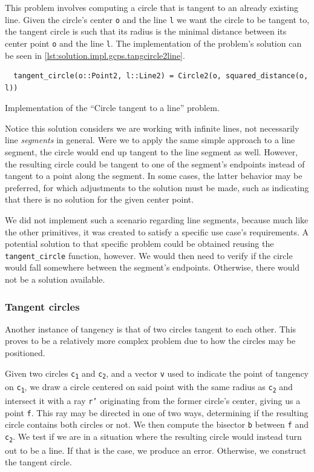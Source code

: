 This problem involves computing a circle that is tangent to an already existing
line.  Given the circle's center \texttt{o} and the line \texttt{l} we want the
circle to be tangent to, the tangent circle is such that its radius is the
minimal distance between its center point \texttt{o} and the line \texttt{l}.
The implementation of the problem's solution can be seen in
\cref{lst:solution.impl.gcps.tangcircle2line}.

\begin{listing}[htb]
  \begin{verbatim}
  tangent_circle(o::Point2, l::Line2) = Circle2(o, squared_distance(o, l))
  \end{verbatim}
  \caption[Circle tangent to a line]{
    Implementation of the ``Circle tangent to a line'' problem.}%
  \label{lst:solution.impl.gcps.tangcircle2line}
\end{listing}

Notice this solution considers we are working with infinite lines, not
necessarily line \textit{segments} in general.  Were we to apply the same simple
approach to a line segment, the circle would end up tangent to the line segment
as well.  However, the resulting circle could be tangent to one of the segment's
endpoints instead of tangent to a point along the segment.  In some cases, the
latter behavior may be preferred, for which adjustments to the solution must be
made, such as indicating that there is no solution for the given center point.

We did not implement such a scenario regarding line segments, because much like
the other primitives, it was created to satisfy a specific use case's
requirements.  A potential solution to that specific problem could be obtained
reusing the \texttt{tangent\_circle} function, however.  We would then need to
verify if the circle would fall somewhere between the segment's endpoints.
Otherwise, there would not be a solution available.

\subsubsection{Tangent circles}%
\label{sec:solution.impl.gcps.tangentcircles}

Another instance of tangency is that of two circles tangent to each other.  This
proves to be a relatively more complex problem due to how the circles may be
positioned.

Given two circles \texttt{c\textsubscript{1}} and \texttt{c\textsubscript{2}},
and a vector \texttt{v} used to indicate the point of tangency on
\texttt{c\textsubscript{1}}, we draw a circle centered on said point with the
same radius as \texttt{c\textsubscript{2}} and intersect it with a ray
\texttt{r'} originating from the former circle's center, giving us a point
\texttt{f}.  This ray may be directed in one of two ways, determining if the
resulting circle contains both circles or not.  We then compute the bisector
\texttt{b} between \texttt{f} and \texttt{c\textsubscript{2}}.  We test if we
are in a situation where the resulting circle would instead turn out to be a
line.  If that is the case, we produce an error.  Otherwise, we construct the
tangent circle.

